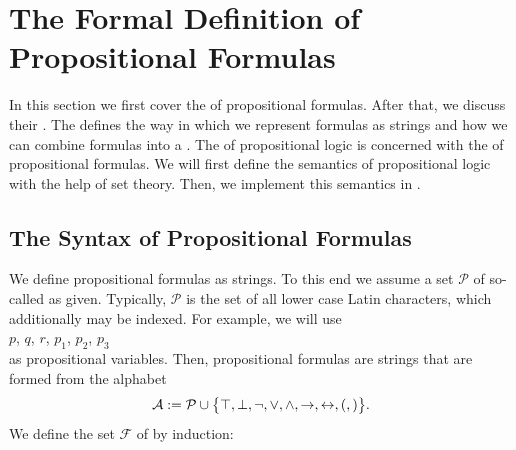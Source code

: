 \section{The Formal Definition of Propositional Formulas}
In this section we first cover the  of propositional formulas.  After that, we discuss their
. The   defines the way in which we represent formulas as strings
and how we can combine formulas into a .  The   of propositional
logic is concerned with the   of propositional formulas.
We will first define the semantics of propositional logic with the help of set theory.
Then, we implement this semantics in \Fsharp.

\subsection{The Syntax of Propositional Formulas}
We define propositional formulas as strings.  To this end we assume a set  $\mathcal{P}$  
of so-called  as given. 
Typically, $\mathcal{P}$ is the set of all lower case Latin characters, which additionally may be indexed.
For example, we will use 
\\[0.2cm]
\hspace*{1.3cm}
$p$, $q$, $r$, $p_1$, $p_2$, $p_3$
\\[0.2cm]
as propositional variables.  Then, propositional formulas are strings that are formed from the alphabet
$$ 
  \mathcal{A} := \mathcal{P} \cup \bigl\{ \top, \bot, \neg, \vee, \wedge,
   \rightarrow, \leftrightarrow, (, ) \bigr\}.
$$
We define the set $\mathcal{F}$ of 
by induction:
